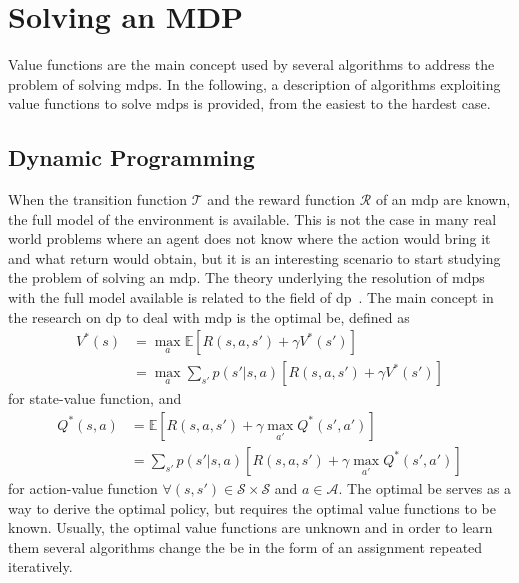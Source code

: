 \section{Solving an MDP}
Value functions are the main concept used by several algorithms to address the problem of solving \glspl{mdp}. In the following, a description of algorithms exploiting value functions to solve \glspl{mdp} is provided, from the easiest to the hardest case.

\subsection{Dynamic Programming}
When the transition function $\mathcal{T}$ and the reward function $\mathcal{R}$ of an \gls{mdp} are known, the full model of the environment is available. This is not the case in many real world problems where an agent does not know where the action would bring it and what return would obtain, but it is an interesting scenario to start studying the problem of solving an \gls{mdp}. The theory underlying the resolution of \glspl{mdp} with the full model available is related to the field of \gls{dp}~\cite{bertsekas2005dynamic, bellman2013dynamic}. The main concept in the research on \gls{dp} to deal with \gls{mdp} is the optimal \gls{be}, defined as
\begin{align}
 V^*(s) &= \max_a \mathbb{E}[R(s,a,s') + \gamma V^*(s')]\nonumber\\
        &= \max_a \sum_{s'} p(s' | s, a)[R(s,a,s') + \gamma V^*(s')]
\end{align}
for state-value function, and
\begin{align}
 Q^*(s,a) &= \mathbb{E}[R(s,a,s') + \gamma \max_{a'}Q^*(s', a')]\nonumber\\
          &= \sum_{s'} p(s' | s, a)[R(s,a,s') + \gamma \max_{a'}Q^*(s', a')]
\end{align}
for action-value function $\forall (s, s') \in \mathcal{S} \times \mathcal{S}$ and $a \in \mathcal{A}$.
The optimal \gls{be} serves as a way to derive the optimal policy, but requires the optimal value functions to be known. Usually, the optimal value functions are unknown and in order to learn them several algorithms change the \gls{be} in the form of an assignment repeated iteratively.

